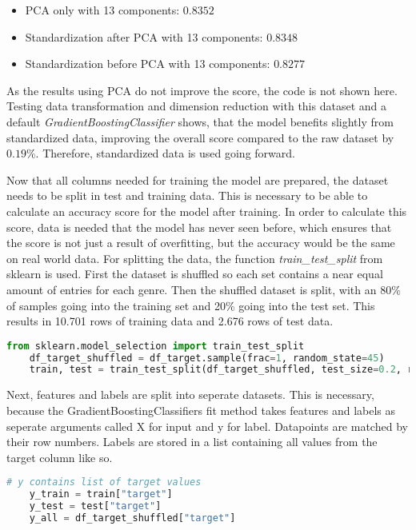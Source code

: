 \begin{itemize}
    \item PCA only with 13 components: $0.8352$
    \item Standardization after PCA with 13 components: $0.8348$
    \item Standardization before PCA with 13 components: $0.8277$
\end{itemize}

As the results using \ac{PCA} do not improve the score, the code is not shown here.
Testing data transformation and dimension reduction with this dataset and a default \emph{GradientBoostingClassifier}
shows, that the model benefits slightly from standardized data, improving the overall score compared to the raw dataset
by $0.19\%$. Therefore, standardized data is used going forward.

Now that all columns needed for training the model are prepared, the dataset needs to be split in 
test and training data. This is necessary to be able to calculate an accuracy score for the model after training.
In order to calculate this score, data is needed that the model has never seen before, which ensures that 
the score is not just a result of overfitting, but the accuracy would be the same on real world data.
For splitting the data, the function \emph{train\_test\_split} from sklearn is used.
First the dataset is shuffled so each set contains a near equal amount of entries for each genre.
Then the shuffled dataset is split, with an 80\% of samples going into the training set and 20\% going 
into the test set. This results in 10.701 rows of training data and 2.676 rows of test data.

\begin{lstlisting}[language=Python]
    from sklearn.model_selection import train_test_split
    df_target_shuffled = df_target.sample(frac=1, random_state=45)
    train, test = train_test_split(df_target_shuffled, test_size=0.2, random_state=45, shuffle=False)
\end{lstlisting}

Next, features and labels are split into seperate datasets. This is necessary, because the GradientBoostingClassifiers
fit method takes features and labels as seperate arguments called X for input and y for label. Datapoints are matched by their row numbers.
Labels are stored in a list containing all values from the target column like so.

\begin{lstlisting}[language=Python]
    # y contains list of target values
    y_train = train["target"]
    y_test = test["target"]
    y_all = df_target_shuffled["target"]
\end{lstlisting}

